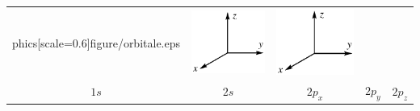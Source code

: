 \begin{center}
\begin{tabular}{ccccc}
phics[scale=0.6]{figure/orbitale.eps} & \includegraphics[scale=0.6]{figure/repere_orbitale.eps} & \includegraphics[scale=0.6]{figure/repere_orbitale.eps} \\
$1s$ & $2s$ & $2p_x$ & $2p_y$ & $2p_z$
\end{tabular}
\end{center}
